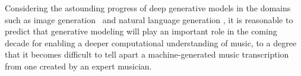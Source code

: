 Considering the astounding progress of deep generative models in the domains such as image generation~\cite{karras2019stylegan} and natural language generation \cite{radford2018gpt}, it is reasonable to predict that generative modeling will play an important role in the coming decade for enabling a deeper computational understanding of music, to a degree that it becomes difficult to tell apart a machine-generated music transcription from one created by an expert musician.





\pagebreak
